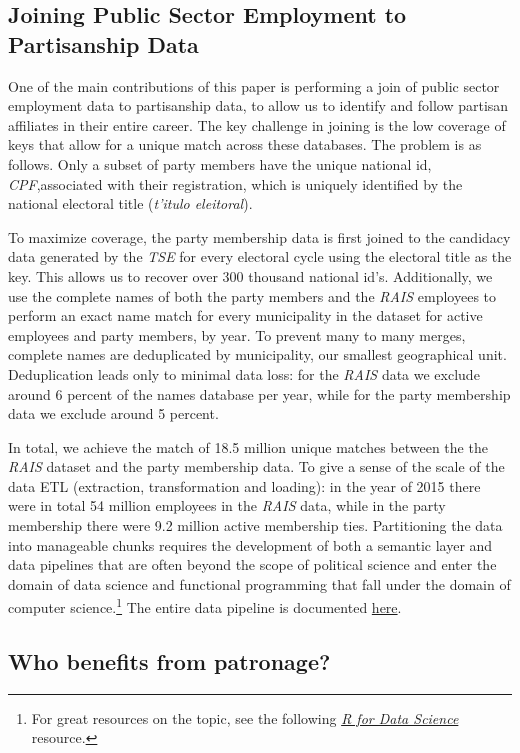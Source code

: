 \documentclass[12pt,a4paper]{article}
\begin{document}
\subsection{Joining Public Sector Employment to Partisanship Data}
One of the main contributions of this paper is performing a join of public sector employment data to partisanship data, to allow us to identify and follow partisan affiliates in their entire career. The key challenge in joining is the low coverage of keys that allow for a unique match across these databases. The problem is as follows. Only a subset of party members have the unique national id, \emph{CPF},associated with their registration, which is uniquely identified by the national electoral title (\emph{t'{i}tulo eleitoral}).

To maximize coverage, the party membership data is first joined to the candidacy data generated by the \emph{TSE} for every electoral cycle using the electoral title as the key. This allows us to recover over 300 thousand national id's. Additionally, we use the complete names of both the party members and the \emph{RAIS} employees to perform an exact name match for every municipality in the dataset for active employees and party members, by year. To prevent many to many merges, complete names are deduplicated by municipality, our smallest geographical unit. Deduplication leads only to minimal data loss: for the \emph{RAIS} data we exclude around 6 percent of the names database per year, while for the party membership data we exclude around 5 percent.

In total, we achieve the match of 18.5 million unique matches between the the \emph{RAIS} dataset and the party membership data. To give a sense of the scale of the data ETL (extraction, transformation and loading): in the year of 2015 there were in total 54 million employees in the \emph{RAIS} data, while in the party membership there were 9.2 million active membership ties. Partitioning the data into manageable chunks requires the development of both a semantic layer and data pipelines that are often beyond the scope of political science and enter the domain of data science and functional programming that fall under the domain of computer science.\footnote{For great resources on the topic, see the following \href{https://r4ds.had.co.nz/index.html}{\emph{R for Data Science}} resource.} The entire data pipeline is documented \href{https://github.com/galileukim/ego_patronage}{here}.

\subsection{Who benefits from patronage?}
\end{document}
